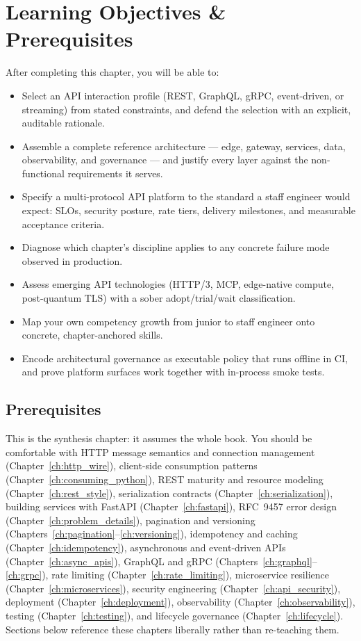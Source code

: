 \section{Learning Objectives \& Prerequisites}

After completing this chapter, you will be able to:

\begin{itemize}
  \item Select an API interaction profile (REST, GraphQL, gRPC,
        event-driven, or streaming) from stated constraints, and defend the
        selection with an explicit, auditable rationale.
  \item Assemble a complete reference architecture --- edge, gateway,
        services, data, observability, and governance --- and justify every
        layer against the non-functional requirements it serves.
  \item Specify a multi-protocol API platform to the standard a staff
        engineer would expect: SLOs, security posture, rate tiers, delivery
        milestones, and measurable acceptance criteria.
  \item Diagnose which chapter's discipline applies to any concrete failure
        mode observed in production.
  \item Assess emerging API technologies (HTTP/3, MCP, edge-native compute,
        post-quantum TLS) with a sober adopt/trial/wait classification.
  \item Map your own competency growth from junior to staff engineer onto
        concrete, chapter-anchored skills.
  \item Encode architectural governance as executable policy that runs
        offline in CI, and prove platform surfaces work together with
        in-process smoke tests.
\end{itemize}

\subsection*{Prerequisites}

This is the synthesis chapter: it assumes the whole book. You should be
comfortable with HTTP message semantics and connection management
(Chapter~\ref{ch:http_wire}), client-side consumption patterns
(Chapter~\ref{ch:consuming_python}), REST maturity and resource modeling
(Chapter~\ref{ch:rest_style}), serialization contracts
(Chapter~\ref{ch:serialization}), building services with FastAPI
(Chapter~\ref{ch:fastapi}), RFC~9457 error design
(Chapter~\ref{ch:problem_details}), pagination and versioning
(Chapters~\ref{ch:pagination}--\ref{ch:versioning}), idempotency and caching
(Chapter~\ref{ch:idempotency}), asynchronous and event-driven APIs
(Chapter~\ref{ch:async_apis}), GraphQL and gRPC
(Chapters~\ref{ch:graphql}--\ref{ch:grpc}), rate limiting
(Chapter~\ref{ch:rate_limiting}), microservice resilience
(Chapter~\ref{ch:microservices}), security engineering
(Chapter~\ref{ch:api_security}), deployment (Chapter~\ref{ch:deployment}),
observability (Chapter~\ref{ch:observability}), testing
(Chapter~\ref{ch:testing}), and lifecycle governance
(Chapter~\ref{ch:lifecycle}). Sections below reference these chapters
liberally rather than re-teaching them.

